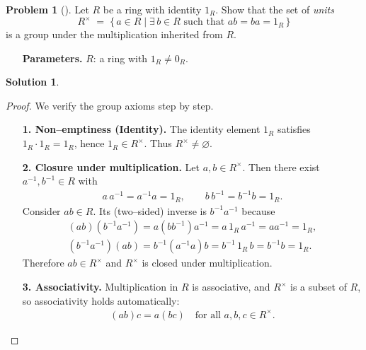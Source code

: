 \documentclass[12pt]{article}
\theoremstyle{definition} %
\newtheorem{solution}{Solution}
\newtheorem{problem}{Problem}
\theoremstyle{plain} %
\begin{document}
\begin{problem}[]
  Let $R$ be a ring with identity $1_R$.
  Show that the set of \emph{units}
  \[
      R^{\times} \;=\; \{\,a\in R \mid \exists\,b\in R \text{ such that } ab = ba = 1_R\,\}
  \]
  is a group under the multiplication inherited from $R$.
  \begin{enumerate}
      \item[\textbf{Parameters.}]
            $R$: a ring with $1_R\neq 0_R$.
  \end{enumerate}
\end{problem}
\begin{solution}
 \begin{proof}
  We verify the group axioms step by step.

  \begin{enumerate}
      \item[\textbf{1. Non–emptiness (Identity).}]
            The identity element $1_R$ satisfies $1_R \cdot 1_R = 1_R$,
            hence $1_R\in R^{\times}$.
            Thus $R^{\times}\neq\varnothing$.

      \item[\textbf{2. Closure under multiplication.}]
            Let $a,b\in R^{\times}$.
            Then there exist $a^{-1},b^{-1}\in R$ with
            \begin{align}
                a\,a^{-1} = a^{-1}a = 1_R,
                \qquad
                b\,b^{-1} = b^{-1}b = 1_R.
            \end{align}
            Consider $ab\in R$.  Its (two–sided) inverse is $b^{-1}a^{-1}$ because
            \begin{align}
                (ab)(b^{-1}a^{-1}) = a(bb^{-1})a^{-1} = a\,1_R\,a^{-1} = aa^{-1} = 1_R, \\[2pt]
                (b^{-1}a^{-1})(ab) = b^{-1}(a^{-1}a)b = b^{-1}\,1_R\,b = b^{-1}b = 1_R.
            \end{align}
            Therefore $ab\in R^{\times}$ and $R^{\times}$ is closed under multiplication.

      \item[\textbf{3. Associativity.}]
            Multiplication in $R$ is associative, and $R^{\times}$ is a subset of $R$,
            so associativity holds automatically:
            \begin{align}
                (ab)c = a(bc)
                \quad\text{for all } a,b,c\in R^{\times}.
            \end{align}


\end{enumerate}
\end{proof}
\end{solution}
\end{document}
